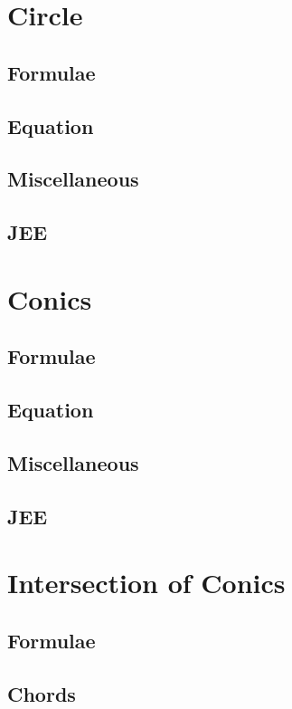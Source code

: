 \documentclass[journal]{IEEEtran}
\begin{document}
\section{Circle}
\subsection{Formulae}

\subsection{Equation}

\subsection{Miscellaneous}

\subsection{JEE}

\newpage
\section{Conics}
\subsection{Formulae}

\subsection{Equation}

\subsection{Miscellaneous}

\subsection{JEE}
 
\newpage
\section{Intersection of Conics}
\subsection{Formulae}

\subsection{Chords}

\end{document}
